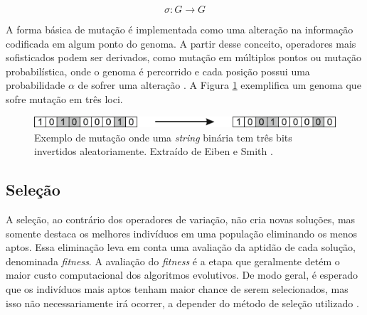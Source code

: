 \documentclass[
	12pt,				%
	openright,			%
	twoside,			%
	a4paper,			%
	tcc,			%
	]{ABNT-DC-UEL}
\begin{document}
\begin{equation}
    \sigma : G \to G
    \label{eq:mutacao}
\end{equation}

A forma básica de mutação é implementada como uma alteração na informação codificada em algum ponto do genoma. A partir desse conceito, operadores mais sofisticados podem ser derivados, como mutação em múltiplos pontos ou mutação probabilística, onde o genoma é percorrido e cada posição possui uma probabilidade $\alpha$ de sofrer uma alteração \cite{ashlock:06}. A Figura \ref{fig:mutacao} exemplifica um genoma que sofre mutação em três loci.

\begin{figure}[htb]
    \centering
    \vspace{0.7cm}
    \includegraphics[scale=1.4]{mutacao}
    \vspace{0.7cm}
    \caption{Exemplo de mutação onde uma \textit{string} binária tem três bits invertidos aleatoriamente. Extraído de Eiben e Smith \cite{eiben:15}.}
    \label{fig:mutacao}
\end{figure}

\subsection{Seleção}

A seleção, ao contrário dos operadores de variação, não cria novas soluções, mas somente destaca os melhores indivíduos em uma população eliminando os menos aptos. Essa eliminação leva em conta uma avaliação da aptidão de cada solução, denominada \textit{fitness}. A avaliação do \textit{fitness} é a etapa que geralmente detém o maior custo computacional dos algoritmos evolutivos. De modo geral, é esperado que os indivíduos mais aptos tenham maior chance de serem selecionados, mas isso não necessariamente irá ocorrer, a depender do método de seleção utilizado \cite{back:00}.
\end{document}
